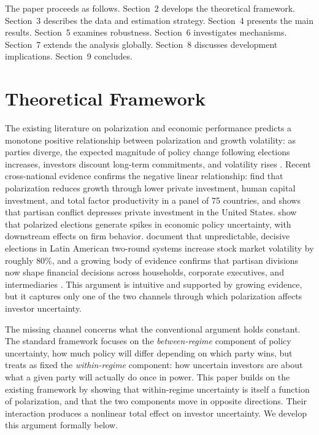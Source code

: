 \documentclass[12pt]{article}
\begin{document}
The paper proceeds as follows. Section~2 develops the theoretical framework.
Section~3 describes the data and estimation strategy. Section~4 presents the
main results. Section~5 examines robustness. Section~6 investigates
mechanisms. Section~7 extends the analysis globally. Section~8 discusses
development implications. Section~9 concludes.


\section{Theoretical Framework}

The existing literature on polarization and economic performance predicts a
monotone positive relationship between polarization and growth volatility:
as parties diverge, the expected magnitude of policy change following
elections increases, investors discount long-term commitments, and volatility
rises \citep{Frye2002, AzzimontTalbert2014, Scartascini2013}. Recent
cross-national evidence confirms the negative linear relationship:
\citet{DornFuestImmelNeumeier2025} find that polarization reduces growth
through lower private investment, human capital investment, and total factor
productivity in a panel of 75 countries, and \citet{Azzimonti2018} shows
that partisan conflict depresses private investment in the United States.
\citet{BakerBloomDavisRodden2020} show that polarized elections generate
spikes in economic policy uncertainty, with downstream effects on firm
behavior. \citet{CarnahanSaiegh2020} document that unpredictable, decisive
elections in Latin American two-round systems increase stock market
volatility by roughly 80\%, and a growing body of evidence confirms that
partisan divisions now shape financial decisions across households,
corporate executives, and intermediaries \citep{KempfTsoutsoura2024}. This
argument is intuitive and supported by growing evidence, but it captures
only one of the two channels through which polarization affects investor
uncertainty.

The missing channel concerns what the conventional argument holds constant.
The standard framework focuses on the \textit{between-regime} component of
policy uncertainty, how much policy will differ depending on which party
wins, but treats as fixed the \textit{within-regime} component: how uncertain
investors are about what a given party will actually do once in power. This
paper builds on the existing framework by showing that within-regime
uncertainty is itself a function of polarization, and that the two
components move in opposite directions. Their interaction produces a
nonlinear total effect on investor uncertainty. We develop this argument
formally below.
\end{document}
